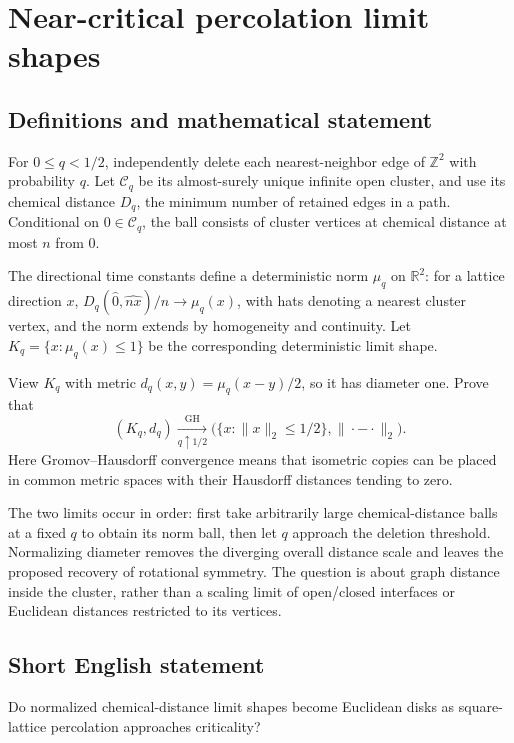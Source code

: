 \documentclass[11pt,a4paper]{article}
\begin{document}
\section*{Near-critical percolation limit shapes}\label{statement}

\subsection{Definitions and mathematical statement}
For $0\le q<1/2$, independently delete each nearest-neighbor edge of $\mathbb Z^2$ with probability $q$. Let $\mathcal C_q$ be its almost-surely unique infinite open cluster, and use its chemical distance $D_q$, the minimum number of retained edges in a path. Conditional on $0\in\mathcal C_q$, the ball consists of cluster vertices at chemical distance at most $n$ from $0$.

The directional time constants define a deterministic norm $\mu_q$ on $\mathbb R^2$: for a lattice direction $x$, $D_q(\widehat0,\widehat{nx})/n\to\mu_q(x)$, with hats denoting a nearest cluster vertex, and the norm extends by homogeneity and continuity. Let $K_q=\{x:\mu_q(x)\le1\}$ be the corresponding deterministic limit shape.

View $K_q$ with metric $d_q(x,y)=\mu_q(x-y)/2$, so it has diameter one. Prove that
\[
(K_q,d_q)\xrightarrow[q\uparrow1/2]{\mathrm{GH}}
\bigl(\{x:\|x\|_2\le1/2\},\|\cdot-\cdot\|_2\bigr).
\]
Here Gromov--Hausdorff convergence means that isometric copies can be placed in common metric spaces with their Hausdorff distances tending to zero.

The two limits occur in order: first take arbitrarily large chemical-distance balls at a fixed $q$ to obtain its norm ball, then let $q$ approach the deletion threshold. Normalizing diameter removes the diverging overall distance scale and leaves the proposed recovery of rotational symmetry. The question is about graph distance inside the cluster, rather than a scaling limit of open/closed interfaces or Euclidean distances restricted to its vertices.
\subsection{Short English statement}
Do normalized chemical-distance limit shapes become Euclidean disks as square-lattice percolation approaches criticality?
\end{document}
